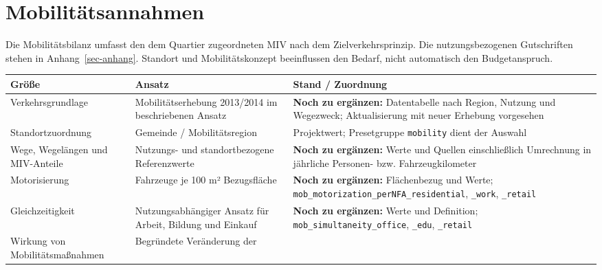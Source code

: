 \documentclass[
  ngerman,
  a4paper,
  DIV=11]{scrreprt}
\newcounter{none} %
\begin{document}
\section{Mobilitätsannahmen}\label{mobilituxe4tsannahmen}

Die Mobilitätsbilanz umfasst den dem Quartier zugeordneten MIV nach dem
Zielverkehrsprinzip. Die nutzungsbezogenen Gutschriften stehen in
Anhang~\ref{sec-anhang}. Standort und Mobilitätskonzept beeinflussen den
Bedarf, nicht automatisch den Budgetanspruch.

{\def\LTcaptype{none} %
\begin{longtable}[]{@{}
  >{\raggedright\arraybackslash}p{}
  >{\raggedright\arraybackslash}p{}
  >{\raggedright\arraybackslash}p{}@{}}
\toprule\noalign{}
\begin{minipage}[b]{\linewidth}\raggedright
Größe
\end{minipage} & \begin{minipage}[b]{\linewidth}\raggedright
Ansatz
\end{minipage} & \begin{minipage}[b]{\linewidth}\raggedright
Stand / Zuordnung
\end{minipage} \\
\midrule\noalign{}
\endhead
\bottomrule\noalign{}
\endlastfoot
Verkehrsgrundlage & Mobilitätserhebung 2013/2014 im beschriebenen Ansatz
& \textbf{Noch zu ergänzen:} Datentabelle nach Region, Nutzung und
Wegezweck; Aktualisierung mit neuer Erhebung vorgesehen \\
Standortzuordnung & Gemeinde / Mobilitätsregion & Projektwert;
Presetgruppe \texttt{mobility} dient der Auswahl \\
Wege, Wegelängen und MIV-Anteile & Nutzungs- und standortbezogene
Referenzwerte & \textbf{Noch zu ergänzen:} Werte und Quellen
einschließlich Umrechnung in jährliche Personen- bzw.
Fahrzeugkilometer \\
Motorisierung & Fahrzeuge je 100 m² Bezugsfläche & \textbf{Noch zu
ergänzen:} Flächenbezug und Werte;
\texttt{mob\_motorization\_perNFA\_residential}, \texttt{\_work},
\texttt{\_retail} \\
Gleichzeitigkeit & Nutzungsabhängiger Ansatz für Arbeit, Bildung und
Einkauf & \textbf{Noch zu ergänzen:} Werte und Definition;
\texttt{mob\_simultaneity\_office}, \texttt{\_edu}, \texttt{\_retail} \\
Wirkung von Mobilitätsmaßnahmen & Begründete Veränderung der

\end{longtable}}
\end{document}
